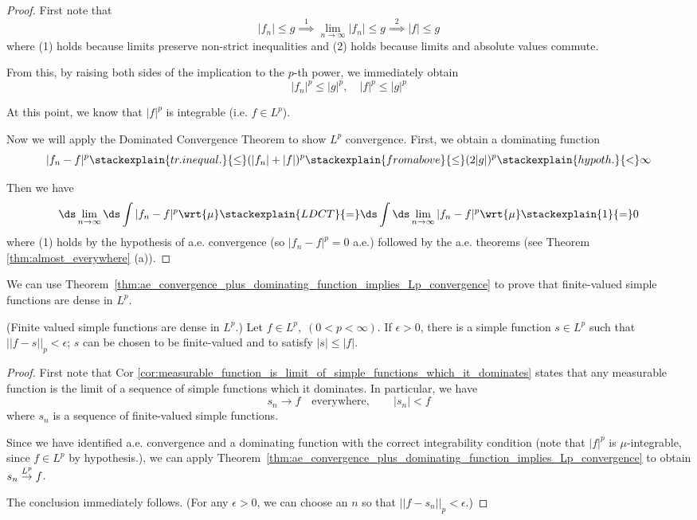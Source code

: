 \documentclass{article} %
\newcommand{\dlim}{\ds\lim}
\newcommand{\dint}{\ds\int}
\newcommand{\dmu}{\wrt{\mu}}
\begin{document}
\begin{proof}
First note that
\[ |f_n| \leq g \stackrel{1}{\implies} \lim_{n \to \infty } |f_n| \leq g \stackrel{2}{\implies} |f| \leq g\]
where (1) holds because limits preserve non-strict inequalities and (2) holds because limits and absolute values commute. 

From this, by raising both sides of the implication to the $p$-th power, we immediately obtain
\[ |f_n|^p \leq |g|^p, \quad |f|^p \leq |g|^p \]	

At this point, we know that $|f|^p$ is integrable (i.e. $f \in L^p$). 

Now we will apply the Dominated Convergence Theorem to show $L^p$ convergence.  First, we obtain a dominating function
\[ |f_n -f|^p \stackexplain{tr. inequal.}{\leq} (|f_n| + |f|)^p \stackexplain{from above}{\leq} (2 |g|)^p \stackexplain{hypoth.}{<} \infty\]

Then we have
%
\[ \dlim_{n \to \infty} \dint |f_n - f|^p \dmu \stackexplain{LDCT}{=} \dint \dlim_{n \to \infty}  |f_n - f|^p \dmu \stackexplain{1}{=}   0 \]
where (1) holds by the hypothesis of a.e. convergence (so $|f_n - f|^p =0$ a.e.) followed by the a.e. theorems (see Theorem \ref{thm:almost_everywhere} (a)). 
\end{proof}


We can use Theorem~\ref{thm:ae_convergence_plus_dominating_function_implies_Lp_convergence} to prove that finite-valued simple functions are dense in $L^p$.

\begin{theorem}\textnormal{(Finite valued simple functions are dense in $L^p$.)}
Let $f \in L^p, \; (0 < p < \infty)$. If $\epsilon >0$, there is a simple function $s \in L^p$ such that $||f-s||_p < \epsilon$; $s$ can be chosen to be finite-valued and to satisfy $|s| \leq |f|$.
\label{thm:finite_valued_simple_functions_are_dense_in_Lp}	
\end{theorem}

\begin{proof}
First note that Cor \ref{cor:measurable_function_is_limit_of_simple_functions_which_it_dominates} states that any measurable function  is the limit of a sequence of simple functions which it dominates.   In particular, we have
\[s_n \to f \quad \text{everywhere}, \quad\quad |s_n| < f \]
where $s_n$ is a sequence of finite-valued simple functions.

Since we have identified a.e. convergence and a dominating function with the correct integrability condition {\tiny (note that $|f|^p$ is $\mu$-integrable, since $f \in L^p$ by hypothesis.)}, we can apply Theorem~\ref{thm:ae_convergence_plus_dominating_function_implies_Lp_convergence} to obtain  $s_n \stackrel{L^p}{\to} f$.   

The conclusion immediately follows. {\tiny (For any $\epsilon>0$, we can choose an $n$ so that $||f-s_n||_p < \epsilon$.)}
 

\end{proof}
\end{document}
